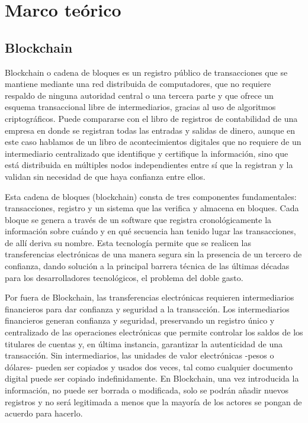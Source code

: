 
\chapter{Marco teórico}

\ifpdf
    \graphicspath{{Chapter2/Figs/}{Chapter2/Figs/PDF/}{Chapter2/Figs/}}
\else
    \graphicspath{{Chapter2/Figs/}{Chapter2/Figs/}}
\fi


\section{Blockchain}
Blockchain o cadena de bloques es un registro público de transacciones que se
mantiene mediante una red distribuida de computadores, que no requiere respaldo de
ninguna autoridad central o una tercera parte y que ofrece un esquema transaccional
libre de intermediarios, gracias al uso de algoritmos criptográficos. Puede compararse con el libro
de registros de contabilidad de una empresa en donde se registran todas las entradas
y salidas de dinero, aunque en este caso hablamos de un libro de acontecimientos
digitales que no requiere de un intermediario centralizado que identifique y certifique la
información, sino que está distribuida en múltiples nodos independientes entre sí que
la registran y la validan sin necesidad de que haya confianza entre ellos.

Esta cadena de bloques (blockchain) consta de tres componentes fundamentales: transacciones,
registro y un sistema que las verifica y almacena en bloques. Cada bloque se genera a través de un
software que registra cronológicamente la información sobre cuándo y en qué secuencia han tenido
lugar las transacciones, de allí deriva su nombre. 
Esta tecnología permite que se realicen las transferencias electrónicas de una manera segura sin la
presencia de un tercero de confianza, dando solución a la principal barrera técnica de las últimas
décadas para los desarrolladores tecnológicos, el problema del doble gasto.

Por fuera de Blockchain, las transferencias electrónicas requieren intermediarios financieros para
dar confianza y seguridad a la transacción. Los intermediarios financieros generan confianza y
seguridad, preservando un registro único y centralizado de las operaciones electrónicas que permite
controlar los saldos de los titulares de cuentas y, en última instancia, garantizar la autenticidad
de una transacción. Sin intermediarios, las unidades de valor electrónicas -pesos o dólares- pueden
ser copiados y usados dos veces, tal como cualquier documento digital puede ser copiado
indefinidamente. En Blockchain, una vez introducida la información, no puede ser borrada o
modificada, solo se podrán añadir nuevos registros y no será legitimada a menos que la mayoría de
los actores se pongan de acuerdo para hacerlo.

